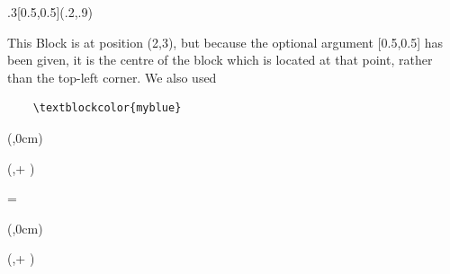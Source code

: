         \begin{textblock}{.3}[0.5,0.5](.2,.9)
    {
		This Block is at position (2,3), but because the optional argument
		[0.5,0.5]
		has been given, it is the centre of the block which is
		located at that point, rather than the top-left corner.
    We also used 
    \begin{verbatim}
    \textblockcolor{myblue}
    \end{verbatim}
    }
	\end{textblock}
  \newenvironment{mybox}[3]{
	  \begin{textblock*}{#1}#2
  	  \begin{minipage}[t][#3][t]{\textwidth}	
  }
  {
	    \end{minipage}
	  \end{textblock*}
  }
  \newlength{\vblocksep}
  \setlength{\vblocksep}{1cm} 
  \newlength{\hblocksep}
  \setlength{\hblocksep}{1cm} 
  \newlength{\xcols}
  \setlength{\xcols}{0.4\textwidth} 
  \newlength{\hcols}
  \setlength{\hcols}{80cm} %
  \newlength{\wcols}
  \setlength{\wcols}{40cm} %
  \newlength{\wcolA}
  \setlength{\wcolA}{.41\wcols} 
  \newlength{\hboxOneA} 
  \setlength{\hboxOneA}{15cm}
  \newlength{\hboxTwoA}
  \setlength{\hboxTwoA}{ \dimexpr ( \hcols - \hboxOneA) \relax}
  
  \begin{mybox}{\wcolA}{(\xcols,0cm)}{\hboxOneA}
      
  \end{mybox}
  \begin{mybox}{\wcolA}{(\xcols,\dimexpr \hboxOneA + \vblocksep \relax )}{\hboxTwoA}
    
  \end{mybox}

  
  \newlength{\wcolB}
  \setlength{\wcolB}{\dimexpr \wcols-\wcolA \relax} 
  \newlength{\hboxOneB}
  =\vtop{%
  	\begin{minipage}[t]{\wcolB}	
      
	  \end{minipage}
  }
  \setlength{\hboxOneB}{\ht0}%
  \addtolength{\hboxOneB}{\dp0}%
  \newlength{\hboxTwoB}
  \setlength{\hboxTwoB}{ \dimexpr ( \hcols - \hboxOneB) \relax}
  
  \newlength{\xcolB}
  \setlength{\xcolB}{\dimexpr \xcols+\wcolA+\hblocksep \relax } 
  \begin{mybox}{\wcolB}{(\xcolB,0cm)}{\hboxOneB}
  \end{mybox}
  \begin{mybox}{\wcolB}{(\xcolB,\dimexpr \hboxOneB + \vblocksep \relax )}{\hboxTwoB}
    
  \end{mybox}
